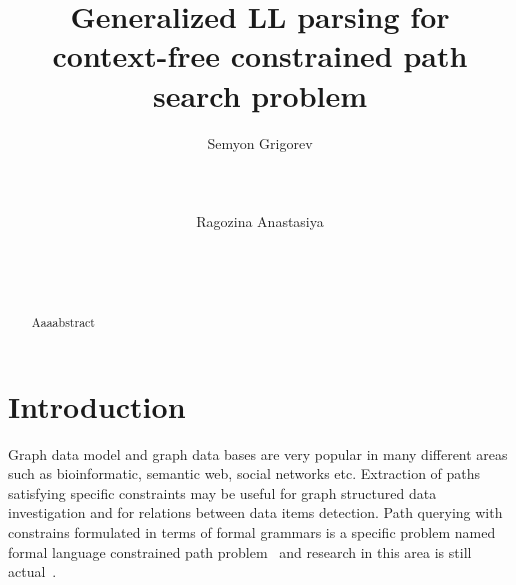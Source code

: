 \documentclass{sig-alternate} %
\begin{document}
\makeatletter
\def\@copyrightspace{\relax}
\makeatother

\title{Generalized LL parsing for context-free constrained path search problem}

\sloppy


\author{
\alignauthor
       Semyon Grigorev\\
       \\
       \\
       \\
\alignauthor
       Ragozina Anastasiya\\
       \\
       \\
       \\
}

\maketitle

\begin{abstract}
Aaaabstract

\end{abstract}

\section{Introduction}
Graph data model and graph data bases are very popular in many different areas such as bioinformatic, semantic web, social networks etc.
Extraction of paths satisfying specific constraints may be useful for graph structured data investigation and for relations between data items detection.
Path querying with constrains formulated in terms of formal grammars is a specific problem named formal language constrained path problem~\cite{FLCpathProblem} and research in this area is still actual~\cite{DirOfBigGraphAnalysis}.
\end{document}
